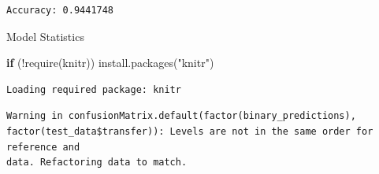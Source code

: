 \documentclass[
  letterpaper,
  DIV=11,
  numbers=noendperiod]{scrartcl}
\newenvironment{Shaded}{\begin{snugshade}}{\end{snugshade}}
\newcommand{\CommentTok}[1]{\textcolor[rgb]{0.37,0.37,0.37}{#1}}
\newcommand{\ControlFlowTok}[1]{\textcolor[rgb]{0.00,0.23,0.31}{\textbf{#1}}}
\newcommand{\DecValTok}[1]{\textcolor[rgb]{0.68,0.00,0.00}{#1}}
\newcommand{\FloatTok}[1]{\textcolor[rgb]{0.68,0.00,0.00}{#1}}
\newcommand{\FunctionTok}[1]{\textcolor[rgb]{0.28,0.35,0.67}{#1}}
\newcommand{\NormalTok}[1]{\textcolor[rgb]{0.00,0.23,0.31}{#1}}
\newcommand{\OtherTok}[1]{\textcolor[rgb]{0.00,0.23,0.31}{#1}}
\newcommand{\SpecialCharTok}[1]{\textcolor[rgb]{0.37,0.37,0.37}{#1}}
\newcommand{\StringTok}[1]{\textcolor[rgb]{0.13,0.47,0.30}{#1}}
\begin{document}
\begin{verbatim}
Accuracy: 0.9441748 
\end{verbatim}

Model Statistics

\begin{Shaded}
\begin{Highlighting}[]
\ControlFlowTok{if}\NormalTok{ (}\SpecialCharTok{!}\FunctionTok{require}\NormalTok{(knitr)) }\FunctionTok{install.packages}\NormalTok{(}\StringTok{"knitr"}\NormalTok{)}
\end{Highlighting}
\end{Shaded}

\begin{verbatim}
Loading required package: knitr
\end{verbatim}

\begin{Shaded}
\end{Shaded}

\begin{verbatim}
Warning in confusionMatrix.default(factor(binary_predictions),
factor(test_data$transfer)): Levels are not in the same order for reference and
data. Refactoring data to match.
\end{verbatim}
\end{document}
